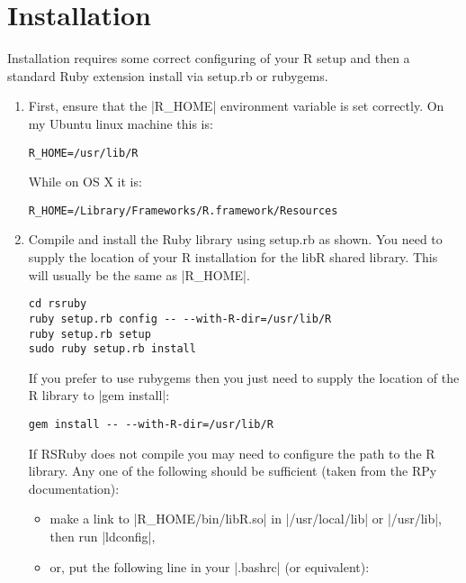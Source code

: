 \documentclass[a4paper,12pt]{book}
\begin{document}
\section{Installation}

Installation requires some correct configuring of your R setup and then a standard Ruby extension install via setup.rb or rubygems.

\begin{enumerate}

\item First, ensure that the |R_HOME| environment variable is set correctly. On my Ubuntu linux machine this is:

\begin{Verbatim}
R_HOME=/usr/lib/R
\end{Verbatim}

While on OS X it is:

\begin{Verbatim}
R_HOME=/Library/Frameworks/R.framework/Resources
\end{Verbatim}

\item Compile and install the Ruby library using setup.rb as shown. You need to supply the location of your R installation for the libR shared library. This will usually be the same as |R_HOME|.

\begin{Verbatim}
cd rsruby
ruby setup.rb config -- --with-R-dir=/usr/lib/R
ruby setup.rb setup
sudo ruby setup.rb install
\end{Verbatim}

If you prefer to use rubygems then you just need to supply the location of the R library to |gem install|:

\begin{Verbatim}
gem install -- --with-R-dir=/usr/lib/R
\end{Verbatim}

If RSRuby does not compile you may need to configure the path to the R library. Any one of the following should be sufficient (taken from the RPy documentation):

\begin{itemize}

\item make a link to |R_HOME/bin/libR.so| in |/usr/local/lib| or |/usr/lib|, then run |ldconfig|,

\item or, put the following line in your |.bashrc| (or equivalent):


\end{itemize}
\end{enumerate}
\end{document}
